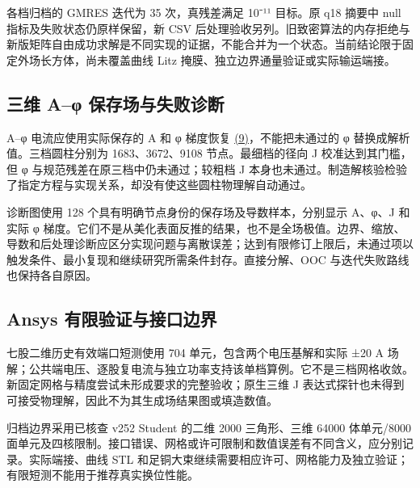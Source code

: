 \documentclass[11pt]{article}
\begin{document}
各档归档的 GMRES 迭代为 35 次，真残差满足 10⁻¹¹ 目标。原 q18 摘要中 null 指标及失败状态仍原样保留，新 CSV 后处理验收另列。旧致密算法的内存拒绝与新版矩阵自由成功求解是不同实现的证据，不能合并为一个状态。当前结论限于固定外场长方体，尚未覆盖曲线 Litz 掩膜、独立边界通量验证或实际输运端接。


\subsection*{三维 A–φ 保存场与失败诊断}
\hypertarget{S2.aphi.heading}{}
A–φ 电流应使用实际保存的 A 和 φ 梯度恢复 \href{paper_zh-CN_single.pdf#E07}{(9)}，不能把未通过的 φ 替换成解析值。三档圆柱分别为 1683、3672、9108 节点。最细档的径向 J 校准达到其门槛，但 φ 与规范残差在原三档中仍未通过；较粗档 J 本身也未通过。制造解核验检验了指定方程与实现关系，却没有使这些圆柱物理解自动通过。


诊断图使用 128 个具有明确节点身份的保存场及导数样本，分别显示 A、φ、J 和实际 φ 梯度。它们不是从美化表面反推的结果，也不是全场极值。边界、缩放、导数和后处理诊断应区分实现问题与离散误差；达到有限修订上限后，未通过项以触发条件、最小复现和继续研究所需条件封存。直接分解、OOC 与迭代失败路线也保持各自原因。


\subsection*{Ansys 有限验证与接口边界}
\hypertarget{S2.ansys.heading}{}
七股二维历史有效端口短测使用 704 单元，包含两个电压基解和实际 ±20 A 场解；公共端电压、逐股复电流与独立功率支持该单档算例。它不是三档网格收敛。新固定网格与精度尝试未形成要求的完整验收；原生三维 J 表达式探针也未得到可接受物理解，因此不为其生成场结果图或填造数值。


归档边界采用已核查 v252 Student 的二维 2000 三角形、三维 64000 体单元/8000 面单元及四核限制。接口错误、网格或许可限制和数值误差有不同含义，应分别记录。实际端接、曲线 STL 和足铜大束继续需要相应许可、网格能力及独立验证；有限短测不能用于推荐真实换位性能。
\end{document}
